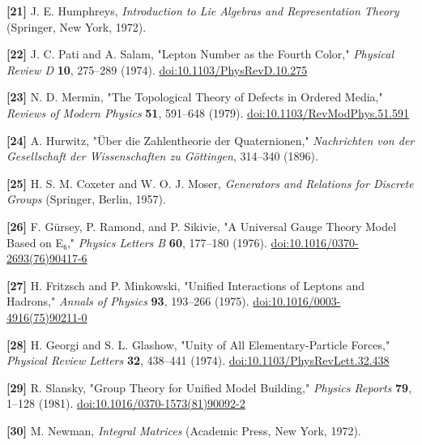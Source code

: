\documentclass[a4paper,11pt]{article}
\begin{document}
\label{ref21}
\noindent \textbf{[21]} J. E. Humphreys, \textit{Introduction to Lie Algebras and Representation Theory} (Springer, New York, 1972).


\label{ref22}
\noindent \textbf{[22]} J. C. Pati and A. Salam, "Lepton Number as the Fourth Color," \textit{Physical Review D} \textbf{10}, 275–289 (1974). \href{https://doi.org/10.1103/PhysRevD.10.275}{doi:10.1103/PhysRevD.10.275}


\label{ref23}
\noindent \textbf{[23]} N. D. Mermin, "The Topological Theory of Defects in Ordered Media," \textit{Reviews of Modern Physics} \textbf{51}, 591–648 (1979). \href{https://doi.org/10.1103/RevModPhys.51.591}{doi:10.1103/RevModPhys.51.591}


\label{ref24}
\noindent \textbf{[24]} A. Hurwitz, "Über die Zahlentheorie der Quaternionen," \textit{Nachrichten von der Gesellschaft der Wissenschaften zu Göttingen}, 314–340 (1896).


\label{ref25}
\noindent \textbf{[25]} H. S. M. Coxeter and W. O. J. Moser, \textit{Generators and Relations for Discrete Groups} (Springer, Berlin, 1957).


\label{ref26}
\noindent \textbf{[26]} F. Gürsey, P. Ramond, and P. Sikivie, "A Universal Gauge Theory Model Based on E₆," \textit{Physics Letters B} \textbf{60}, 177–180 (1976). \href{https://doi.org/10.1016/0370-2693(76)90417-6}{doi:10.1016/0370-2693(76)90417-6}


\label{ref27}
\noindent \textbf{[27]} H. Fritzsch and P. Minkowski, "Unified Interactions of Leptons and Hadrons," \textit{Annals of Physics} \textbf{93}, 193–266 (1975). \href{https://doi.org/10.1016/0003-4916(75)90211-0}{doi:10.1016/0003-4916(75)90211-0}


\label{ref28}
\noindent \textbf{[28]} H. Georgi and S. L. Glashow, "Unity of All Elementary-Particle Forces," \textit{Physical Review Letters} \textbf{32}, 438–441 (1974). \href{https://doi.org/10.1103/PhysRevLett.32.438}{doi:10.1103/PhysRevLett.32.438}


\label{ref29}
\noindent \textbf{[29]} R. Slansky, "Group Theory for Unified Model Building," \textit{Physics Reports} \textbf{79}, 1–128 (1981). \href{https://doi.org/10.1016/0370-1573(81)90092-2}{doi:10.1016/0370-1573(81)90092-2}


\label{ref30}
\noindent \textbf{[30]} M. Newman, \textit{Integral Matrices} (Academic Press, New York, 1972).
\end{document}
